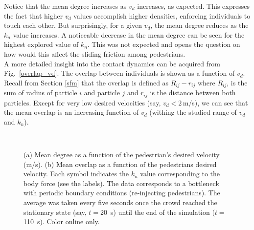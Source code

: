 \documentclass[preprint,12pt]{elsarticle}
\begin{document}
Notice that the mean degree increases as $v_d$ increases, as expected. This expresses the fact that
higher $v_d$ values accomplish higher densities, enforcing individuals to touch each 
other. But surprisingly, for a given $v_d$, the mean degree reduces as the $k_n$ 
value increases. A noticeable decrease in the mean degree can be seen for the 
highest explored value of $k_n$. This was not expected and opens the question on how would
this affect the sliding friction among pedestrians.\\

A more detailed insight into the contact dynamics can be acquired from 
Fig.~\ref{overlap_vd}. The overlap between individuals is shown as a function of 
$v_d$. Recall from Section \ref{sfm} that the overlap is defined as 
$R_{ij}-r_{ij}$ where $R_{ij}$, is the sum of radius of particle $i$ and 
particle $j$ and $r_{ij}$  is the distance between both particles. Except for 
very low desired velocities (say, $v_d<2\,$m/s), we can see that the mean 
overlap is an increasing function of $v_d$ (withing the studied
range of $v_d$ and $k_n$).\\


\begin{figure}[!htbp]
\centering
    \ 
    \\
\caption[width=0.47\columnwidth]{(a) Mean degree as a function of the pedestrian’s desired velocity (m/s). (b) Mean overlap as a function of the pedestrians desired velocity. Each symbol indicates the $k_n$ value corresponding to the body force (see the labels). The data corresponds to a bottleneck with periodic boundary conditions (re-injecting pedestrians). The average was taken every five seconds once the crowd reached the stationary state (say, $t=$20~s) until the end of the simulation ($t=$110~s). Color online only.}
\label{degree_overlap_vd}
\end{figure}
\end{document}
